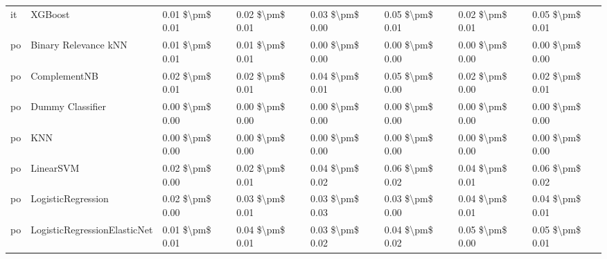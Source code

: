 \begin{tabular}{llllllll}
      it &                         XGBoost & 0.01 \$\textbackslash pm\$ 0.01 &           0.02 \$\textbackslash pm\$ 0.01 &       0.03 \$\textbackslash pm\$ 0.00 &        0.05 \$\textbackslash pm\$ 0.01 &                         0.02 \$\textbackslash pm\$ 0.01 &     0.05 \$\textbackslash pm\$ 0.01 \\
      po &            Binary Relevance kNN & 0.01 \$\textbackslash pm\$ 0.01 &           0.01 \$\textbackslash pm\$ 0.01 &       0.00 \$\textbackslash pm\$ 0.00 &        0.00 \$\textbackslash pm\$ 0.00 &                         0.00 \$\textbackslash pm\$ 0.00 &     0.00 \$\textbackslash pm\$ 0.00 \\
      po &                    ComplementNB & 0.02 \$\textbackslash pm\$ 0.01 &           0.02 \$\textbackslash pm\$ 0.01 &       0.04 \$\textbackslash pm\$ 0.01 &        0.05 \$\textbackslash pm\$ 0.00 &                         0.02 \$\textbackslash pm\$ 0.00 &     0.02 \$\textbackslash pm\$ 0.01 \\
      po &                Dummy Classifier & 0.00 \$\textbackslash pm\$ 0.00 &           0.00 \$\textbackslash pm\$ 0.00 &       0.00 \$\textbackslash pm\$ 0.00 &        0.00 \$\textbackslash pm\$ 0.00 &                         0.00 \$\textbackslash pm\$ 0.00 &     0.00 \$\textbackslash pm\$ 0.00 \\
      po &                             KNN & 0.00 \$\textbackslash pm\$ 0.00 &           0.00 \$\textbackslash pm\$ 0.00 &       0.00 \$\textbackslash pm\$ 0.00 &        0.00 \$\textbackslash pm\$ 0.00 &                         0.00 \$\textbackslash pm\$ 0.00 &     0.00 \$\textbackslash pm\$ 0.00 \\
      po &                       LinearSVM & 0.02 \$\textbackslash pm\$ 0.00 &           0.02 \$\textbackslash pm\$ 0.01 &       0.04 \$\textbackslash pm\$ 0.02 &        0.06 \$\textbackslash pm\$ 0.02 &                         0.04 \$\textbackslash pm\$ 0.01 &     0.06 \$\textbackslash pm\$ 0.02 \\
      po &              LogisticRegression & 0.02 \$\textbackslash pm\$ 0.00 &           0.03 \$\textbackslash pm\$ 0.01 &       0.03 \$\textbackslash pm\$ 0.03 &        0.03 \$\textbackslash pm\$ 0.00 &                         0.04 \$\textbackslash pm\$ 0.01 &     0.04 \$\textbackslash pm\$ 0.01 \\
      po &    LogisticRegressionElasticNet & 0.01 \$\textbackslash pm\$ 0.01 &           0.04 \$\textbackslash pm\$ 0.01 &       0.03 \$\textbackslash pm\$ 0.02 &        0.04 \$\textbackslash pm\$ 0.02 &                         0.05 \$\textbackslash pm\$ 0.00 &     0.05 \$\textbackslash pm\$ 0.01 \\

\end{tabular}
